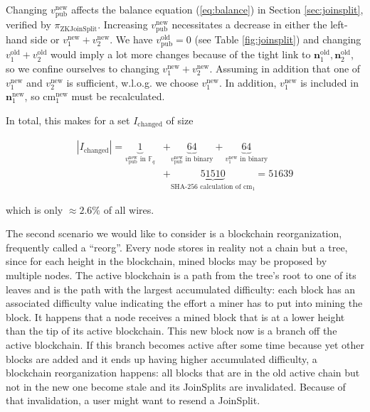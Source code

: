 \documentclass{article}
\begin{document}
Changing $v_\text{pub}^\text{new}$ affects the balance equation (\ref{eq:balance}) in Section \ref{sec:joinsplit}, verified by $\pi_\text{ZKJoinSplit}$.
Increasing $v_\text{pub}^\text{new}$ necessitates a decrease in either the left-hand side or $v_1^\text{new} + v_2^\text{new}$.
We have $v_\text{pub}^\text{old} = 0$ (see Table \ref{fig:joinsplit}) and changing $v_1^\text{old} + v_2^\text{old}$ would imply a lot more changes because of the tight link to $\boldsymbol{n}^\text{old}_1,\boldsymbol{n}^\text{old}_2$, so we confine ourselves to changing $v_1^\text{new} + v_2^\text{new}$.
Assuming in addition that one of $v_1^\text{new}$ and $v_2^\text{new}$ is sufficient, w.l.o.g. we choose $v_1^\text{new}$.
In addition, $v_1^\text{new}$ is included in $\boldsymbol{n}^\text{new}_1$, so $\text{cm}_1^\text{new}$ must be recalculated.

In total, this makes for a set $I_\text{changed}$ of size

\begin{align*}
        |I_\text{changed}| = \underbrace{1}_\text{$v_\text{pub}^\text{new}$ in $\mathbb{F}_q$} &+ \underbrace{64}_\text{$v_\text{pub}^\text{new}$ in binary} + \underbrace{64}_\text{$v_1^\text{new}$ in binary} \\
        &+ \underbrace{51510}_\text{SHA-256 calculation of $\text{cm}_1$} = 51639
\end{align*}

which is only $\approx 2.6\%$ of all wires.

The second scenario we would like to consider is a blockchain reorganization, frequently called a ``reorg''.
Every node stores in reality not a chain but a tree, since for each height in the blockchain, mined blocks may be proposed by multiple nodes.
The active blockchain is a path from the tree's root to one of its leaves and is the path with the largest accumulated difficulty: each block has an associated difficulty value indicating the effort a miner has to put into mining the block.
It happens that a node receives a mined block that is at a lower height than the tip of its active blockchain.
This new block now is a branch off the active blockchain.
If this branch becomes active after some time because yet other blocks are added and it ends up having higher accumulated difficulty, a blockchain reorganization happens: all blocks that are in the old active chain but not in the new one become stale and its JoinSplits are invalidated.
Because of that invalidation, a user might want to resend a JoinSplit.
\end{document}
